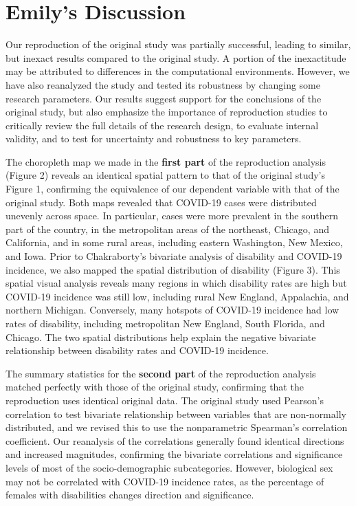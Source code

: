 \documentclass[
]{article}
\begin{document}
\hypertarget{emilys-discussion}{%
\section{Emily's Discussion}\label{emilys-discussion}}

Our reproduction of the original study was partially successful, leading
to similar, but inexact results compared to the original study. A
portion of the inexactitude may be attributed to differences in the
computational environments. However, we have also reanalyzed the study
and tested its robustness by changing some research parameters. Our
results suggest support for the conclusions of the original study, but
also emphasize the importance of reproduction studies to critically
review the full details of the research design, to evaluate internal
validity, and to test for uncertainty and robustness to key parameters.

The choropleth map we made in the \textbf{first part} of the
reproduction analysis (Figure 2) reveals an identical spatial pattern to
that of the original study's Figure 1, confirming the equivalence of our
dependent variable with that of the original study. Both maps revealed
that COVID-19 cases were distributed unevenly across space. In
particular, cases were more prevalent in the southern part of the
country, in the metropolitan areas of the northeast, Chicago, and
California, and in some rural areas, including eastern Washington, New
Mexico, and Iowa. Prior to Chakraborty's bivariate analysis of
disability and COVID-19 incidence, we also mapped the spatial
distribution of disability (Figure 3). This spatial visual analysis
reveals many regions in which disability rates are high but COVID-19
incidence was still low, including rural New England, Appalachia, and
northern Michigan. Conversely, many hotspots of COVID-19 incidence had
low rates of disability, including metropolitan New England, South
Florida, and Chicago. The two spatial distributions help explain the
negative bivariate relationship between disability rates and COVID-19
incidence.

The summary statistics for the \textbf{second part} of the reproduction
analysis matched perfectly with those of the original study, confirming
that the reproduction uses identical original data. The original study
used Pearson's correlation to test bivariate relationship between
variables that are non-normally distributed, and we revised this to use
the nonparametric Spearman's correlation coefficient. Our reanalysis of
the correlations generally found identical directions and increased
magnitudes, confirming the bivariate correlations and significance
levels of most of the socio-demographic subcategories. However,
biological sex may not be correlated with COVID-19 incidence rates, as
the percentage of females with disabilities changes direction and
significance.
\end{document}
